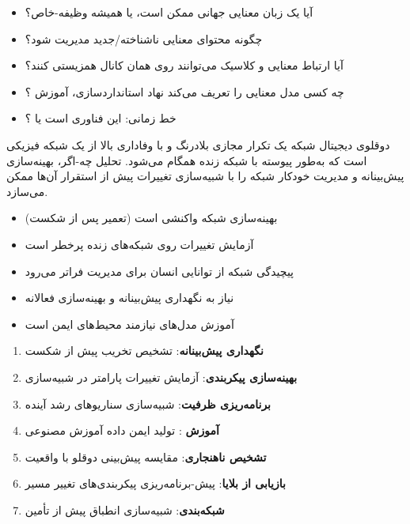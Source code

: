 \begin{itemize}
\tightlist
\item
  آیا یک زبان معنایی جهانی ممکن است، یا همیشه وظیفه-خاص؟
\item
  چگونه محتوای معنایی ناشناخته/\allowbreak{}جدید مدیریت شود؟
\item
  آیا ارتباط معنایی و کلاسیک می‌توانند روی همان کانال همزیستی کنند؟
\item
  چه کسی مدل معنایی را تعریف می‌کند  نهاد استانداردسازی، آموزش ؟
\item
  خط زمانی: این فناوری  است یا ؟
\end{itemize}



\CNchained{}

\CNchained{}

دوقلوی دیجیتال شبکه یک تکرار مجازی بلادرنگ و با وفاداری بالا از یک شبکه فیزیکی است که به‌طور پیوسته با شبکه زنده همگام می‌شود. تحلیل چه-اگر، بهینه‌سازی پیش‌بینانه و مدیریت خودکار شبکه را با شبیه‌سازی تغییرات پیش از استقرار آن‌ها ممکن می‌سازد.


\begin{itemize}
\tightlist
\item
  بهینه‌سازی شبکه واکنشی است (تعمیر پس از شکست)
\item
  آزمایش تغییرات روی شبکه‌های زنده پرخطر است
\item
  پیچیدگی شبکه  از توانایی انسان برای مدیریت فراتر می‌رود
\item
  نیاز به نگهداری پیش‌بینانه و بهینه‌سازی فعالانه
\item
  آموزش مدل‌های  نیازمند محیط‌های ایمن است
\end{itemize}





\begin{enumerate}
\def\labelenumi{\arabic{enumi}.}
\tightlist
\item
  \textbf{نگهداری پیش‌بینانه}: تشخیص تخریب پیش از شکست
\item
  \textbf{بهینه‌سازی پیکربندی}: آزمایش تغییرات پارامتر در شبیه‌سازی
\item
  \textbf{برنامه‌ریزی ظرفیت}: شبیه‌سازی سناریوهای رشد آینده
\item
  \textbf{آموزش }: تولید ایمن داده آموزش مصنوعی
\item
  \textbf{تشخیص ناهنجاری}: مقایسه پیش‌بینی دوقلو با واقعیت
\item
  \textbf{بازیابی از بلایا}: پیش-برنامه‌ریزی پیکربندی‌های تغییر مسیر
\item
  \textbf{شبکه‌بندی}: شبیه‌سازی انطباق  پیش از تأمین
\end{enumerate}

